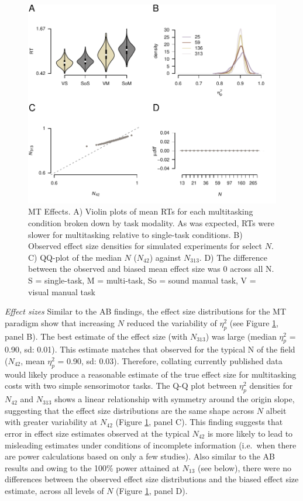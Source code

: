 \documentclass{article}
\begin{document}
\begin{figure}

{\centering \includegraphics[width=0.8\linewidth]{../images/IMMSD_fx_main} 

}

\caption{MT Effects. A) Violin plots of mean RTs for each multitasking condition broken down by task modality. As was expected, RTs were slower for multitasking relative to single-task conditions. B) Observed effect size densities for simulated experiments for select $N$. C) QQ-plot of the median $N$ ($N_{42}$) against $N_{313}$. D) The difference between the observed and biased mean effect size was 0 across all N. S = single-task, M = multi-task, So = sound manual task, V = visual manual task}\label{fig:MTFX}
\end{figure}

\emph{Effect sizes} Similar to the AB findings, the effect size distributions for the MT paradigm show that increasing \(N\) reduced the variability of \(\eta_{p}^2\) (see Figure \ref{fig:MTFX}, panel B). The best estimate of the effect size (with \(N_{313}\)) was large (median \(\eta_{p}^2\) = 0.90, sd: 0.01). This estimate matches that observed for the typical N of the field (\(N_{42}\), mean \(\eta_{p}^2\) = 0.90, sd: 0.03). Therefore, collating currently published data would likely produce a reasonable estimate of the true effect size for multitasking costs with two simple sensorimotor tasks. The Q-Q plot between \(\eta_{p}^2\) densities for \(N_{42}\) and \(N_{313}\) shows a linear relationship with symmetry around the origin slope, suggesting that the effect size distributions are the same shape across \(N\) albeit with greater variability at \(N_{42}\) (Figure \ref{fig:MTFX}, panel C). This finding suggests that error in effect size estimates observed at the typical \(N_{42}\) is more likely to lead to misleading estimates under conditions of incomplete information (i.e.~when there are power calculations based on only a few studies). Also similar to the AB results and owing to the 100\% power attained at \(N_{13}\) (see below), there were no differences between the observed effect size distributions and the biased effect size estimate, across all levels of \(N\) (Figure \ref{fig:MTFX}, panel D).
\end{document}
